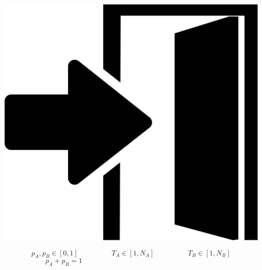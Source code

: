 \begin{frame}
    \includegraphics[scale=0.04]{Bin/door.png}

    \[
        p_A, p_B \in [0, 1] \hspace{2cm} T_A \in [1, N_A] \hspace{2cm} T_B \in [1, N_B]
    \]    
    \[
        p_A + p_B = 1 \hspace{8cm}
    \]
\end{frame}

